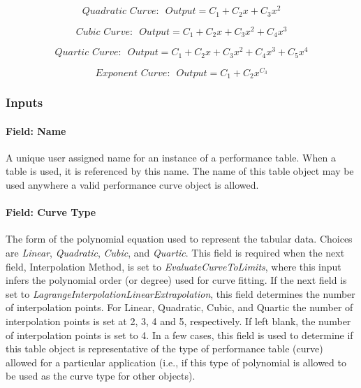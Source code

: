 \begin{equation}
Quadratic\,\,Curve:\,\,\,Output = {C_1} + {C_2}x + {C_3}{x^2}
\end{equation}

\begin{equation}
Cubic\,\,Curve:\,\,\,Output = {C_1} + {C_2}x + {C_3}{x^2} + {C_4}{x^3}
\end{equation}

\begin{equation}
Quartic\,\,Curve:\,\,\,Output = {C_1} + {C_2}x + {C_3}{x^2} + {C_4}{x^3} + {C_5}{x^4}
\end{equation}

\begin{equation}
Exponent\,\,Curve:\,\,\,Output = {C_1} + {C_2}{x^{{C_3}}}
\end{equation}

\subsubsection{Inputs}\label{inputs-032}

\paragraph{Field: Name}\label{field-name-031}

A unique user assigned name for an instance of a performance table. When a table is used, it is referenced by this name. The name of this table object may be used anywhere a valid performance curve object is allowed.

\paragraph{Field: Curve Type}\label{field-curve-type}

The form of the polynomial equation used to represent the tabular data. Choices are \emph{Linear}, \emph{Quadratic}, \emph{Cubic}, and \emph{Quartic}. This field is required when the next field, Interpolation Method, is set to \emph{EvaluateCurveToLimits}, where this input infers the polynomial order (or degree) used for curve fitting. If the next field is set to \emph{LagrangeInterpolationLinearExtrapolation}, this field determines the number of interpolation points. For Linear, Quadratic, Cubic, and Quartic the number of interpolation points is set at 2, 3, 4 and 5, respectively. If left blank, the number of interpolation points is set to 4. In a few cases, this field is used to determine if this table object is representative of the type of performance table (curve) allowed for a particular application (i.e., if this type of polynomial is allowed to be used as the curve type for other objects).

